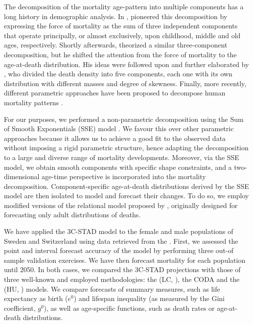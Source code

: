 \documentclass[11pt, a4paper]{article}
\begin{document}
The decomposition of the mortality age-pattern into multiple components has a long history in demographic analysis. In \citeyear{thiele1871mathematical}, \citeauthor{thiele1871mathematical} pioneered this decomposition by expressing the force of mortality as the sum of three independent components that operate principally, or almost exclusively, upon childhood, middle and old ages, respectively. Shortly afterwards, \cite{lexis1878duree} theorized a similar three-component decomposition, but he shifted the attention from the force of mortality to the age-at-death distribution. His ideas were followed upon and further elaborated by \cite{pearson1897chances}, who divided the death density into five components, each one with its own distribution with different masses and degree of skewness. Finally, more recently, different parametric approaches have been proposed to decompose human mortality patterns \citep{siler1979competing,heligman1980age,kostaki1992nine,de2016new,mazzuco2018mortality}.

For our purposes, we performed a non-parametric decomposition using the Sum of Smooth Exponentials (SSE) model \citep{camarda2016sums}. We favour this over other parametric approaches because it allows us to achieve a good fit to the observed data without imposing a rigid parametric structure, hence adapting the decomposition to a large and diverse range of mortality developments. Moreover, via the SSE model, we obtain smooth components with specific shape constraints, and a two-dimensional age-time perspective is incorporated into the mortality decomposition. Component-specific age-at-death distributions derived by the SSE model are then isolated to model and forecast their changes. To do so, we employ modified versions of the relational model proposed by \cite{basellini2019stad}, originally designed for forecasting only adult distributions of deaths.

We have applied the 3C-STAD model to the female and male populations of Sweden and Switzerland using data retrieved from the \cite{HMD}. First, we assessed the point and interval forecast accuracy of the model by performing three out-of sample validation exercises. We have then forecast mortality for each population until 2050. In both cases, we compared the 3C-STAD projections with those of three well-known and employed methodologies: the \citeauthor{lee1992modeling} (LC, \citeyear{lee1992modeling}), the CODA \citep{oeppen2008coherent} and the \citeauthor{hyndman2007robust} (HU, \citeyear{hyndman2007robust}) models. We compare forecasts of summary measures, such as life expectancy as birth ($e^{0}$) and lifespan inequality (as measured by the Gini coefficient, $g^{0}$), as well as age-specific functions, such as death rates or age-at-death distributions.
\end{document}
